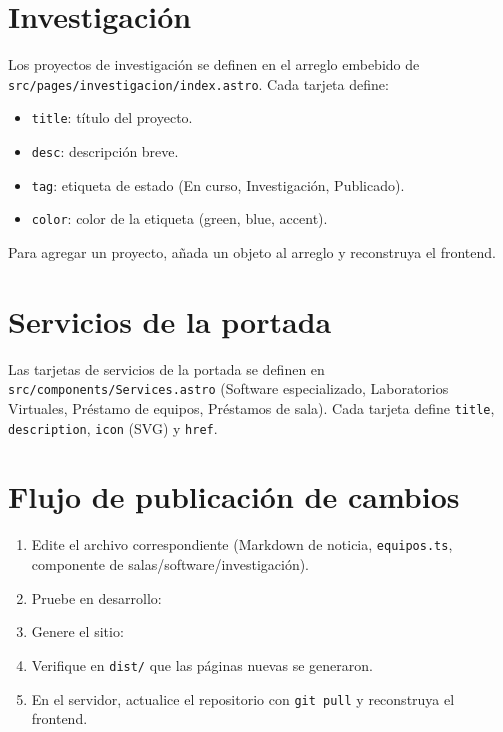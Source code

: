 \documentclass[12pt,a4paper]{report}
\begin{document}
\section{Investigación}

Los proyectos de investigación se definen en el arreglo embebido de
\texttt{src/pages/investigacion/index.astro}. Cada tarjeta define:

\begin{itemize}
  \item \texttt{title}: título del proyecto.
  \item \texttt{desc}: descripción breve.
  \item \texttt{tag}: etiqueta de estado (En curso, Investigación, Publicado).
  \item \texttt{color}: color de la etiqueta (green, blue, accent).
\end{itemize}

Para agregar un proyecto, añada un objeto al arreglo y reconstruya el frontend.

\section{Servicios de la portada}

Las tarjetas de servicios de la portada se definen en
\texttt{src/components/Services.astro} (Software especializado, Laboratorios
Virtuales, Préstamo de equipos, Préstamos de sala). Cada tarjeta define
\texttt{title}, \texttt{description}, \texttt{icon} (SVG) y \texttt{href}.

\section{Flujo de publicación de cambios}

\begin{enumerate}
  \item Edite el archivo correspondiente (Markdown de noticia, \texttt{equipos.ts},
        componente de salas/software/investigación).
  \item Pruebe en desarrollo: 
  \item Genere el sitio: 
  \item Verifique en \texttt{dist/} que las páginas nuevas se generaron.
  \item En el servidor, actualice el repositorio con \texttt{git pull} y
        reconstruya el frontend.
\end{enumerate}
\end{document}
